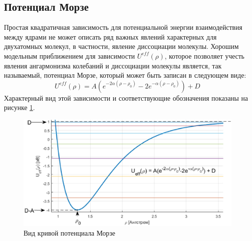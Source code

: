 \documentclass[a4paper, 12pt]{article}
\begin{document}
\subsection{Потенциал Морзе}
Простая квадратичная зависимость для потенциальной энергии
взаимодействия между ядрами не может описать ряд важных явлений
характерных для двухатомных молекул, в частности, явление диссоциации молекулы. Хорошим модельным приближением для зависимости $U^{eff}(\rho)$, которое позволяет учесть явления ангармонизма колебаний и диссоциации молекулы является, так называемый, потенциал Морзе,
который может быть записан в следующем виде:
\begin{equation}
	U^{eff}(\rho)=A(e^{-2\alpha(\rho-\rho_0)}-2e^{-\alpha(\rho-\rho_0)})+D
\end{equation}
Характерный вид этой зависимости и соответствующие обозначения
показаны на рисунке \ref{MorseGraph}.
\begin{figure}
	\includegraphics[width=\linewidth]{Morse.png}
	\caption{Вид кривой потенциала Морзе}
	\label{MorseGraph}
\end{figure}
\end{document}
